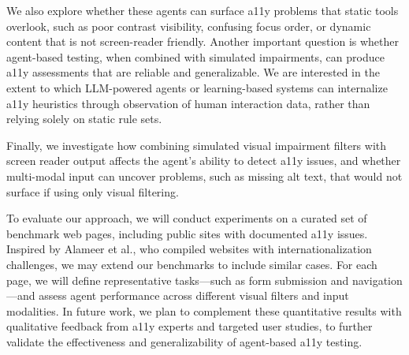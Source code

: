 We also explore whether these agents can surface \ac{a11y} problems that static tools overlook, such as poor contrast visibility, confusing focus order, or dynamic content that is not screen-reader friendly. Another important question is whether agent-based testing, when combined with simulated impairments, can produce \ac{a11y} assessments that are reliable and generalizable. We are interested in the extent to which LLM-powered agents or learning-based systems can internalize \ac{a11y} heuristics through observation of human interaction data, rather than relying solely on static rule sets.

Finally, we investigate how combining simulated visual impairment filters with screen reader output affects the agent's ability to detect \ac{a11y} issues, and whether multi-modal input can uncover problems, such as missing alt text, that would not surface if using only visual filtering.

To evaluate our approach, we will conduct experiments on a curated set of benchmark web pages, including public sites with documented \ac{a11y} issues. Inspired by Alameer et al.\cite{alameer2016detecting}, who compiled websites with internationalization challenges, we may extend our benchmarks to include similar cases. For each page, we will define representative tasks—such as form submission and navigation—and assess agent performance across different visual filters and input modalities. In future work, we plan to complement these quantitative results with qualitative feedback from \ac{a11y} experts and targeted user studies, to further validate the effectiveness and generalizability of agent-based \ac{a11y} testing.

